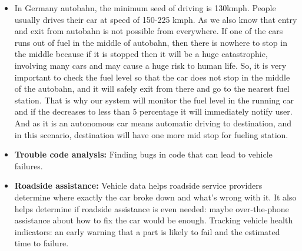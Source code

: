\begin{itemize}
	 \item In Germany autobahn, the minimum seed of driving is 130kmph. People usually drives their car at speed of 150-225 kmph. As we also know that entry and exit from autobahn is not possible from everywhere. If one of the cars runs out of fuel in the middle of autobahn, then there is nowhere to stop in the middle because if it is stopped then it will be a huge catastrophic, involving many cars and may cause a huge risk to human life. So, it is very important to check the fuel level so that the car does not stop in the middle of the autobahn, and it will safely exit from there and go to the nearest fuel station. That is why our system will monitor the fuel level in the running car and if the decreases to less than 5 percentage it will immediately notify user. And as it is an autonomous car means automatic driving to destination, and in this scenario, destination will have one more mid stop for fueling station.
	 
	 \item \textbf{Trouble code analysis:} Finding bugs in code that can lead to vehicle failures.
	 \item \textbf{Roadside assistance:} Vehicle data helps roadside service providers determine where exactly the car broke down and what’s wrong with it. It also helps determine if roadside assistance is even needed: maybe over-the-phone assistance about how to fix the car would be enough. Tracking vehicle health indicators: an early warning that a part is likely to fail and the estimated time to failure.

\end{itemize}
